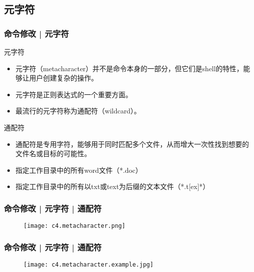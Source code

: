\subsection{元字符}
\begin{frame}
  \frametitle{命令修改 | 元字符}
  \begin{block}{元字符}
    \begin{itemize}[<+->]
      \item 元字符（metacharacter）并不是命令本身的一部分，但它们是shell的特性，能够让用户创建复杂的操作。
      \item 元字符是正则表达式的一个重要方面。
      \item 最流行的元字符称为通配符（wildcard）。
    \end{itemize}
  \end{block}
  \pause
  \begin{block}{通配符}
    \begin{itemize}[<+->]
      \item 通配符是专用字符，能够用于同时匹配多个文件，从而增大一次性找到想要的文件名或目标的可能性。
      \item 指定工作目录中的所有word文件（*.doc）
      \item 指定工作目录中的所有以txt或text为后缀的文本文件（*.t[ex]*）
    \end{itemize}
  \end{block}
\end{frame}

\begin{frame}
  \frametitle{命令修改 | 元字符 | \alert{通配符}}
  \begin{figure}
    \centering
    \texttt{[image: c4.metacharacter.png]}
  \end{figure}
\end{frame}

\begin{frame}
  \frametitle{命令修改 | 元字符 | 通配符}
  \begin{figure}
    \centering
    \texttt{[image: c4.metacharacter.example.jpg]}
  \end{figure}
\end{frame}

